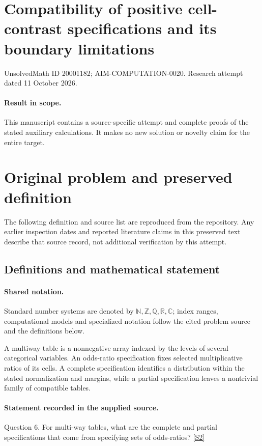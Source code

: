 \documentclass[11pt]{article}
\begin{document}
\section*{Compatibility of positive cell-contrast specifications and its boundary limitations}
\noindent UnsolvedMath ID 20001182; AIM-COMPUTATION-0020. Research attempt dated 11 October 2026.
\paragraph{Result in scope.}This manuscript contains a source-specific attempt and complete proofs of the stated auxiliary calculations. It makes no new solution or novelty claim for the entire target.
\section{Original problem and preserved definition}
The following definition and source list are reproduced from the repository. Any earlier inspection dates and reported literature claims in this preserved text describe that source record, not additional verification by this attempt.
\subsection{Definitions and mathematical statement}

\paragraph{Shared notation.}Standard number systems are denoted by $\mathbb N,\mathbb Z,\mathbb Q,\mathbb R,\mathbb C$; index ranges, computational models and specialized notation follow the cited problem source and the definitions below.


A multiway table is a nonnegative array indexed by the levels of several categorical variables. An odds-ratio specification fixes selected multiplicative ratios of its cells. A complete specification identifies a distribution within the stated normalization and margins, while a partial specification leaves a nontrivial family of compatible tables.
\paragraph{Statement recorded in the supplied source.}
Question 6. For multi-way tables, what are the complete and partial specifications that come from specifying sets of odds-ratios? \href{https://aimath.org/WWN/compalgstat/compalgstat.pdf}{[S2]}
\end{document}

